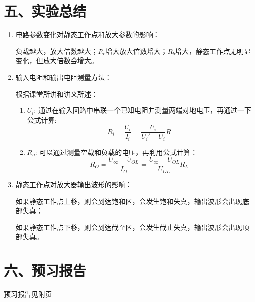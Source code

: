 \documentclass[a4paper,10pt,notitlepage]{article}
\begin{document}
		\section*{五、实验总结}
		\begin{enumerate}
			\item 电路参数变化对静态工作点和放大参数的影响：\par 
			负载越大，放大倍数越大；$R_c$增大放大倍数增大；$R_b$增大，静态工作点无明显变化，但放大倍数会增大。\par 
			\item  输入电阻和输出电阻测量方法：\par 
			根据课堂所讲和讲义所述：\par 
			\begin{enumerate}
				\item $U_i$: 通过在输入回路中串联一个已知电阻并测量两端对地电压，再通过一下公式计算: $$R_i=\frac{U_i}{I_i}=\frac{U_i}{U_i'-U_i}R$$
				\item $R_o$: 可以通过测量空载和负载的电压，再利用公式计算：
				$$R_O=\frac{U_\infty-U_{OL}}{I_O}=\frac{U_\infty-U_{OL}}{U_{OL}}R_L$$
			\end{enumerate}
			\item 静态工作点对放大器输出波形的影响：\par 
			如果静态工作点上移，则会到达饱和区，会发生饱和失真，输出波形会出现底部失真；\par 
			如果静态工作点下移，则会到达截至区，会发生截止失真，输出波形会出现顶部失真。
		\end{enumerate}
		\section*{六、预习报告}
		预习报告见附页
\end{document}
